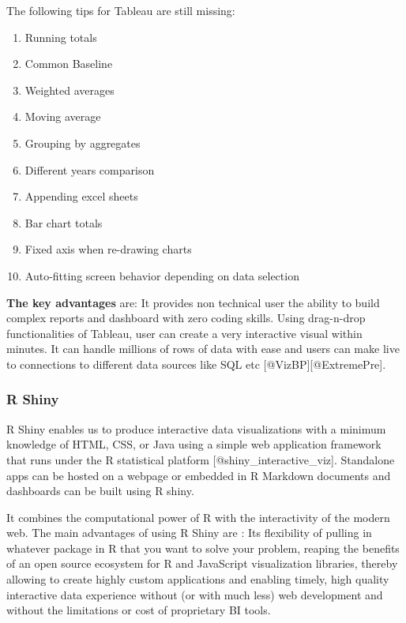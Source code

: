 \documentclass[]{book}
\providecommand{\tightlist}{%
  \setlength{\itemsep}{0pt}\setlength{\parskip}{0pt}}
\theoremstyle{definition}
\theoremstyle{definition}
\theoremstyle{definition}
\theoremstyle{remark}
\begin{document}
The following tips for Tableau are still missing:

\begin{enumerate}
\def\labelenumi{\arabic{enumi}.}
\tightlist
\item
  Running totals
\item
  Common Baseline
\item
  Weighted averages
\item
  Moving average
\item
  Grouping by aggregates
\item
  Different years comparison
\item
  Appending excel sheets
\item
  Bar chart totals
\item
  Fixed axis when re-drawing charts
\item
  Auto-fitting screen behavior depending on data selection
\end{enumerate}

\textbf{The key advantages} are: It provides non technical user the
ability to build complex reports and dashboard with zero coding skills.
Using drag-n-drop functionalities of Tableau, user can create a very
interactive visual within minutes. It can handle millions of rows of
data with ease and users can make live to connections to different data
sources like SQL etc {[}@VizBP{]}{[}@ExtremePre{]}.

\subsubsection{R Shiny}\label{r-shiny-1}

R Shiny enables us to produce interactive data visualizations with a
minimum knowledge of HTML, CSS, or Java using a simple web application
framework that runs under the R statistical platform
{[}@shiny\_interactive\_viz{]}. Standalone apps can be hosted on a
webpage or embedded in R Markdown documents and dashboards can be built
using R shiny.

It combines the computational power of R with the interactivity of the
modern web. The main advantages of using R Shiny are : Its flexibility
of pulling in whatever package in R that you want to solve your problem,
reaping the benefits of an open source ecosystem for R and JavaScript
visualization libraries, thereby allowing to create highly custom
applications and enabling timely, high quality interactive data
experience without (or with much less) web development and without the
limitations or cost of proprietary BI tools.
\end{document}
